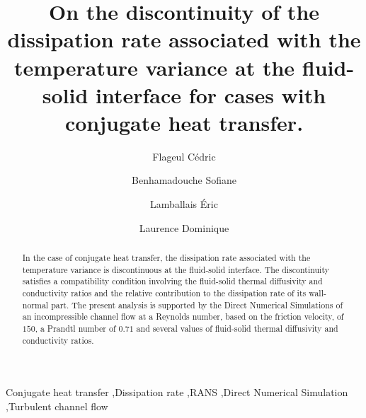 \documentclass[review]{elsarticle}
\begin{document}
\begin{frontmatter}

\title{On the discontinuity of the dissipation rate associated with the temperature variance at the fluid-solid interface for cases with conjugate heat transfer.}


\author[myaddress,mymainaddress]{Flageul C\'edric}

\author[mymainaddress]{Benhamadouche Sofiane}
\author[mysecondaryaddress]{Lamballais \'Eric}
\author[mythirdaddress,mymainaddress]{Laurence Dominique}

\address[myaddress]{Institut Jo\v{z}ef Stefan, R4 Division, Jamova cesta 39, SI-1000 Ljubljana, Slovenia}
\address[mymainaddress]{EDF R\&D, Fluid Mechanics, Energy and Environment Dept. 6 Quai Wattier, 78401 Chatou, France}
\address[mysecondaryaddress]{Institute PPRIME, Department of Fluid Flow, Heat Transfer and Combustion, Universit\'e de Poitiers, CNRS, ENSMA, T\'el\'eport 2 - Bd. Marie et Pierre Curie B.P. 30179, 86962 Futuroscope Chasseneuil Cedex, France}
\address[mythirdaddress]{School of Mechanical, Aerospace and Civil Engineering, The University of Manchester, Sackville Street, Manchester M13 9PL, UK}

\begin{abstract}
In the case of conjugate heat transfer, the dissipation rate associated with the temperature variance is discontinuous at the fluid-solid interface. The discontinuity satisfies a compatibility condition involving the fluid-solid thermal diffusivity and conductivity ratios and the relative contribution to the dissipation rate of its wall-normal part. The present analysis is supported by the Direct Numerical Simulations of an incompressible channel flow at a Reynolds number, based on the friction velocity, of $150$, a Prandtl number of $0.71$ and several values of fluid-solid thermal diffusivity and conductivity ratios.
\end{abstract}

\begin{keyword}
Conjugate heat transfer \sep Dissipation rate \sep RANS \sep Direct Numerical Simulation \sep Turbulent channel flow
\end{keyword}

\end{frontmatter}
\end{document}
